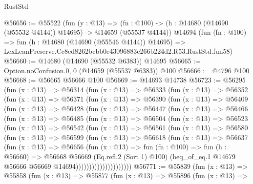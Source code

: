 \begin{lexlean}{RustStd}
\begin{coremodule}
@56656 := @55522
    (fun (y : @13) =>
    (fn : @100) -> (h : @14680 (@14690 (@55532 @4144)) @14695) -> @14659 (@55537 @4144))
    @14694
    (fun (fn : @100) =>
    fun (h : @14680 (@14690 (@55546 @4144)) @14695) =>
    LexLeanPreserve.Cc8ed8262bcbb0e43096883c266b224d2.R53.RustStd.fun58)
@56660 := @14680 (@14690 (@55532 @6383)) @14695
@56665 := Option.noConfusion.{0, 0} (@14659 (@55537 @6383)) @100
@56666 := @4796 @100
@56668 := @56665 @56666 @100
@56669 := @14693 @14738
@56723 := @56295
    (fun (x : @13) =>
    @56314
      (fun (x : @13) =>
      @56333
        (fun (x : @13) =>
        @56352
          (fun (x : @13) =>
          @56371
            (fun (x : @13) =>
            @56390
              (fun (x : @13) =>
              @56409
                (fun (x : @13) =>
                @56428
                  (fun (x : @13) =>
                  @56447
                    (fun (x : @13) =>
                    @56466
                      (fun (x : @13) =>
                      @56485
                        (fun (x : @13) =>
                        @56504
                          (fun (x : @13) =>
                          @56523
                            (fun (x : @13) =>
                            @56542
                              (fun (x : @13) =>
                              @56561
                                (fun (x : @13) =>
                                @56580
                                  (fun (x : @13) =>
                                  @56599
                                    (fun (x : @13) =>
                                    @56618
                                      (fun (x : @13) =>
                                      @56637
                                        (fun (x : @13) =>
                                        @56656
                                          (fun (x : @13) =>
                                          fun (fn : @100) =>
                                          fun (h : @56660) =>
                                          @56668
                                            @56669
                                            (Eq.refl.{2} (Sort 1) @100)
                                            (heq_of_eq.{1}
                                              @14679
                                              @56666
                                              @56669
                                              @14694)))))))))))))))))))))
@56771 := @55839
    (fun (x : @13) =>
    @55858
      (fun (x : @13) =>
      @55877
        (fun (x : @13) =>
        @55896
          (fun (x : @13) =>

\end{coremodule}
\end{lexlean}
